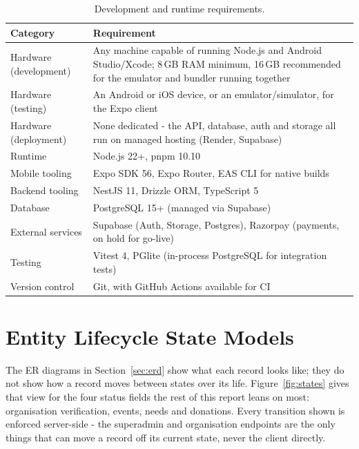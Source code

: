 \begin{table}[H]\centering
\caption{Development and runtime requirements.}
\label{tab:sysreq}
\begin{tabularx}{\textwidth}{|p{}|X|}
\hline
\textbf{Category} & \textbf{Requirement}\\\hline
Hardware (development) & Any machine capable of running Node.js and Android Studio/Xcode; 8\,GB RAM minimum, 16\,GB recommended for the emulator and bundler running together\\\hline
Hardware (testing) & An Android or iOS device, or an emulator/simulator, for the Expo client\\\hline
Hardware (deployment) & None dedicated - the API, database, auth and storage all run on managed hosting (Render, Supabase)\\\hline
Runtime & Node.js 22+, pnpm 10.10\\\hline
Mobile tooling & Expo SDK 56, Expo Router, EAS CLI for native builds\\\hline
Backend tooling & NestJS 11, Drizzle ORM, TypeScript 5\\\hline
Database & PostgreSQL 15+ (managed via Supabase)\\\hline
External services & Supabase (Auth, Storage, Postgres), Razorpay (payments, on hold for go-live)\\\hline
Testing & Vitest 4, PGlite (in-process PostgreSQL for integration tests)\\\hline
Version control & Git, with GitHub Actions available for CI\\\hline
\end{tabularx}
\end{table}

\section{Entity Lifecycle State Models}
\label{sec:state-models}
The ER diagrams in Section~\ref{sec:erd} show what each record looks like; they do not show how a record moves between states over its life. Figure~\ref{fig:states} gives that view for the four status fields the rest of this report leans on most: organisation verification, events, needs and donations. Every transition shown is enforced server-side - the superadmin and organisation endpoints are the only things that can move a record off its current state, never the client directly.

